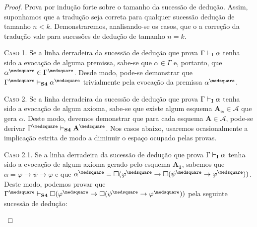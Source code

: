     \begin{proof}
        Prova por indução forte sobre o tamanho da sucessão de dedução.
        Assim, suponhamos que a tradução seja correta para qualquer sucessão dedução de tamanho $n<k$.
        Demonstraremos, analisando-se os casos, que o a correção da tradução vale para sucessões de dedução de tamanho $n=k$.

        \begin{case}
            \textsc{Caso 1.}
            Se a linha derradeira da sucessão de dedução que prova $\Gamma\mathrel{\vdash}_\mathbf{I}\alpha$ tenha sido a evocação de alguma premissa, sabe-se que $\alpha\in\Gamma$ e, portanto, que $\alpha^\medsquare\in\Gamma^\medsquare$. Desde modo, pode-se demonstrar que $\Gamma^\medsquare\entails_\mathbf{S4}\alpha^\medsquare$ trivialmente pela evocação da premissa $\alpha^\medsquare$.
        \end{case}

        \begin{case}
            \textsc{Caso 2.}
            Se a linha derradeira da sucessão de dedução que prova $\Gamma\mathrel{\vdash}_\mathbf{I}\alpha$ tenha sido a evocação de algum axioma, sabe-se que existe algum esquema $\mathbf{A_\alpha}\in\mathcal{A}$ que gera $\alpha$. Deste modo, devemos demonstrar que para cada esquema $\mathbf{A}\in\mathcal{A}$, pode-se derivar $\Gamma^\medsquare\entails_\mathbf{S4}\mathbf{A}^\medsquare$. Nos casos abaixo, usaremos ocasionalmente a implicação estrita de modo a diminuir o espaço ocupado pelas provas.
        \end{case}

            \begin{subcase}
                \textsc{Caso 2.1.} Se a linha derradeira da sucessão de dedução que prova $\Gamma\mathrel{\vdash}_\mathbf{I}\alpha$ tenha sido a evocação de algum axioma gerado pelo esquema $\hyperref[IA1]{\mathbf{A_1}}$, sabemos que $\alpha=\varphi\to\psi\to\varphi$ e que $\alpha^\medsquare=\nec(\varphi^\medsquare\to\nec(\psi^\medsquare\to\varphi^\medsquare))$. Deste modo, podemos provar que $\Gamma^\medsquare\entails_\mathbf{S4}\nec(\varphi^\medsquare\to\nec(\psi^\medsquare\to\varphi^\medsquare))$ pela seguinte sucessão de dedução:


\end{subcase}
\end{proof}
